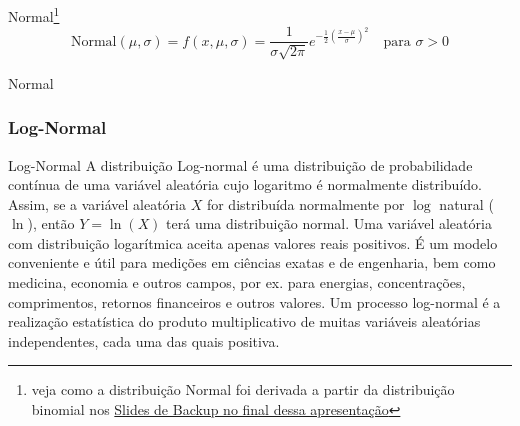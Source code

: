 \begin{frame}{Normal\footnote{veja como a distribuição Normal foi derivada a partir da distribuição binomial nos \hyperlink{appendixnormal}{Slides de Backup no final dessa apresentação}}}
    $$\text{Normal}(\mu,\sigma) = f(x, \mu, \sigma) = \frac{1}{\sigma{\sqrt{2\pi }}}e^{-{\frac{1}{2}}\left({\frac {x-\mu }{\sigma }}\right)^{2}} \quad \text{para $\sigma > 0$}$$
\end{frame}

\begin{frame}{Normal}
    \centering
\end{frame}

\subsubsection{Log-Normal}
\begin{frame}{Log-Normal}
    A distribuição Log-normal é uma distribuição de probabilidade contínua de uma
    variável aleatória cujo logaritmo é normalmente distribuído. Assim, se a variável
    aleatória $X$ for distribuída normalmente por $\log$ natural ($\ln$),
    então $Y = \ln(X)$ terá uma distribuição normal.
    \vfill
    Uma variável aleatória com distribuição logarítmica aceita apenas valores reais
    positivos. É um modelo conveniente e útil para medições em ciências exatas e de
    engenharia, bem como medicina, economia e outros campos, por ex. para energias,
    concentrações, comprimentos, retornos financeiros e outros valores.
    \vfill
    Um processo log-normal é a realização estatística do produto multiplicativo de
    muitas variáveis aleatórias independentes, cada uma das quais positiva.
\end{frame}


